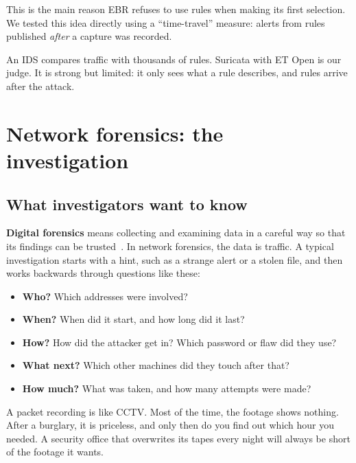This is the main reason EBR refuses to use rules when making its first selection. We tested this idea directly using a ``time-travel'' measure: alerts from rules published \emph{after} a capture was recorded.

\begin{recap}
An IDS compares traffic with thousands of rules. Suricata with ET Open is our judge. It is strong but limited: it only sees what a rule describes, and rules arrive after the attack.
\end{recap}

\chapter{Network forensics: the investigation}

\section{What investigators want to know}
\textbf{Digital forensics} means collecting and examining data in a careful way so that its findings can be trusted~\cite{nist86}. In network forensics, the data is traffic. A typical investigation starts with a hint, such as a strange alert or a stolen file, and then works backwards through questions like these:
\begin{itemize}
\item \textbf{Who?} Which addresses were involved?
\item \textbf{When?} When did it start, and how long did it last?
\item \textbf{How?} How did the attacker get in? Which password or flaw did they use?
\item \textbf{What next?} Which other machines did they touch after that?
\item \textbf{How much?} What was taken, and how many attempts were made?
\end{itemize}

\begin{analogy}
A packet recording is like CCTV. Most of the time, the footage shows nothing. After a burglary, it is priceless, and only then do you find out which hour you needed. A security office that overwrites its tapes every night will always be short of the footage it wants.
\end{analogy}

